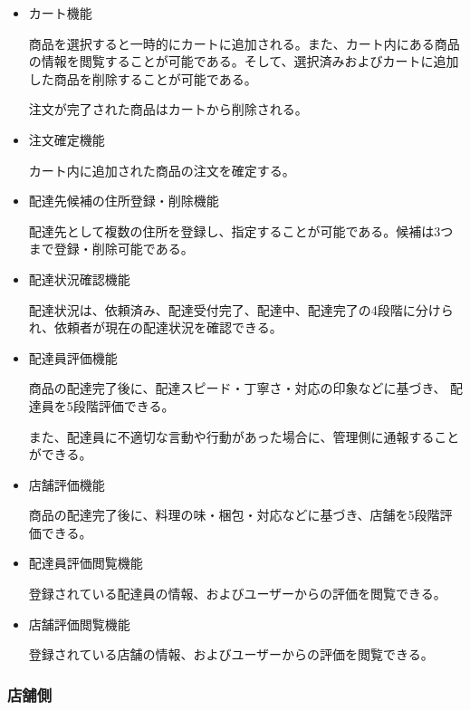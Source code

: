\begin{itemize}
\begin{itemize}
        \item カート機能

        商品を選択すると一時的にカートに追加される。また、カート内にある商品の情報を閲覧することが可能である。そして、選択済みおよびカートに追加した商品を削除することが可能である。

        注文が完了された商品はカートから削除される。

        
        \item 注文確定機能
        
        カート内に追加された商品の注文を確定する。
        
        \item 配達先候補の住所登録・削除機能
        
        配達先として複数の住所を登録し、指定することが可能である。候補は3つまで登録・削除可能である。
        
        \item 配達状況確認機能
        
        配達状況は、依頼済み、配達受付完了、配達中、配達完了の4段階に分けられ、依頼者が現在の配達状況を確認できる。

        \item 配達員評価機能
        
        商品の配達完了後に、配達スピード・丁寧さ・対応の印象などに基づき、 配達員を5段階評価できる。

        また、配達員に不適切な言動や行動があった場合に、管理側に通報することができる。

        \item 店舗評価機能
        
        商品の配達完了後に、料理の味・梱包・対応などに基づき、店舗を5段階評価できる。
        
        \item 配達員評価閲覧機能 
        
        登録されている配達員の情報、およびユーザーからの評価を閲覧できる。

        \item 店舗評価閲覧機能 
        
        登録されている店舗の情報、およびユーザーからの評価を閲覧できる。 
    \end{itemize}
  
\end{itemize}



\subsubsection{店舗側}

